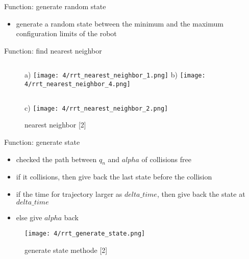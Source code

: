 \documentclass[%
  professionalfonts,%
  xcolor={%
    usenames,%
    dvipsnames,%
    svgnames,%
    table,%
    hyperref%
  }%
]{beamer}
\begin{document}
      \begin{frame}{Function: generate random state}
        \begin{itemize}
          \item generate a random state between the minimum and the maximum configuration limits of the robot
        \end{itemize}
        
      \end{frame}




\begin{frame}{Function: find nearest neighbor}
	\begin{figure}[h]
		\footnotesize
		\begin{columns}
			\vspace{-50pt}
			a)
			\texttt{[image: 4/rrt\_nearest\_neighbor\_1.png]}
			\vspace{-50pt}
			b)
			\texttt{[image: 4/rrt\_nearest\_neighbor\_4.png]}
		\end{columns}
		\vspace{15pt}
		\begin{columns}
			\column[c]{.25\textwidth}
			\column[c]{.01\textwidth}
			\vspace{-50pt}
			c)
			\column[c]{.49\textwidth}
			\texttt{[image: 4/rrt\_nearest\_neighbor\_2.png]}
			\column[c]{.25\textwidth}
		\end{columns}
		\caption{nearest neighbor [2]}
		\label{fig:generate state methode}
	\end{figure}
	\vspace{-35pt}
\end{frame}

\begin{frame}{Function: generate state}
	\begin{itemize}
		\item checked the path between $q_n$ and $alpha$ of collisions free
		\item if it collisions, then give back the last state before the collision
		\item if the time for trajectory larger as $delta\_time$, then give back the state at $delta\_time$
		\item else give $alpha$ back
	\end{itemize}
	
	\begin{figure}[h]
		\texttt{[image: 4/rrt\_generate\_state.png]}
		\caption{generate state methode [2]}
		\label{fig:generate state methode}
	\end{figure}
\end{frame}
\end{document}
